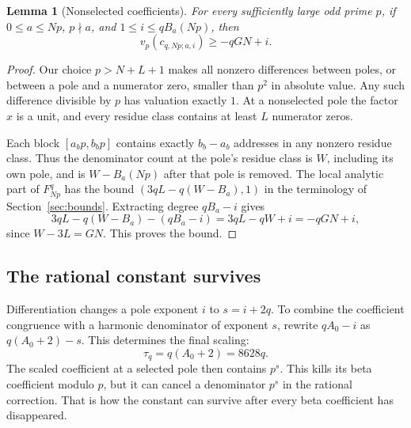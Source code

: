 \documentclass[11pt]{article}
\newtheorem{lemma}[theorem]{Lemma}
\begin{document}
\begin{lemma}[Nonselected coefficients]\label{lem:other}
For every sufficiently large odd prime $p$, if $0\le a\le Np$,
$p\nmid a$, and $1\le i\le qB_a(Np)$, then
\begin{equation}\label{eq:nonselected}
 v_p(c_{q,Np;a,i})\ge-qGN+i.
\end{equation}
\end{lemma}
\begin{proof}
Our choice $p>N+L+1$ makes all nonzero differences between poles, or
between a pole and a numerator zero, smaller than $p^2$ in absolute
value. Any such difference divisible by $p$ has valuation exactly $1$.
At a nonselected pole the factor $x$ is a unit, and every residue class
contains at least $L$ numerator zeros.

Each block $[a_bp,b_bp]$ contains exactly $b_b-a_b$ addresses in any
nonzero residue class. Thus the denominator count at the pole's residue
class is $W$, including its own pole, and is $W-B_a(Np)$ after that
pole is removed. The local analytic part of $F_{Np}^q$ has the bound
$(3qL-q(W-B_a),1)$ in the terminology of Section~\ref{sec:bounds}.
Extracting degree $qB_a-i$ gives
\[
 3qL-q(W-B_a)-(qB_a-i)=3qL-qW+i=-qGN+i,
\]
since $W-3L=GN$. This proves the bound.
\end{proof}

\subsection{The rational constant survives}
Differentiation changes a pole exponent $i$ to $s=i+2q$. To combine
the coefficient congruence with a harmonic denominator of exponent $s$,
rewrite $qA_0-i$ as $q(A_0+2)-s$. This determines the final scaling:
\begin{equation}\label{eq:tau}
 \tau_q=q(A_0+2)=8628q.
\end{equation}
The scaled coefficient at a selected pole then contains $p^s$. This
kills its beta coefficient modulo $p$, but it can cancel a denominator
$p^s$ in the rational correction. That is how the constant can survive
after every beta coefficient has disappeared.
\end{document}
